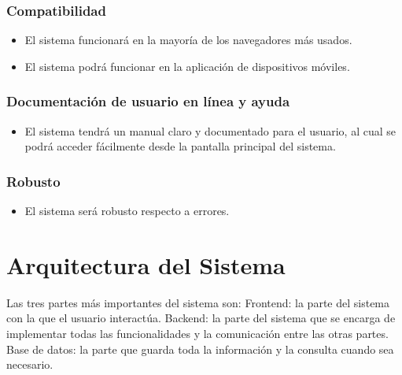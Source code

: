 \documentclass[12pt]{article}
\newcounter{ni}
\begin{document}
\subsubsection{Compatibilidad}
\begin{itemize}
    \item El sistema funcionará en la mayoría de los navegadores más usados.
    \item El sistema podrá funcionar en la aplicación de dispositivos móviles. 
\end{itemize}


\subsubsection{Documentación de usuario en línea y ayuda}
\begin{itemize}
    \item El sistema tendrá un manual claro y documentado para el usuario, al cual se podrá acceder fácilmente desde la pantalla principal del sistema.
\end{itemize}


\subsubsection{Robusto}
\begin{itemize}
    \item El sistema será robusto respecto a errores.
\end{itemize}






\section{Arquitectura del Sistema}

Las tres partes más importantes del sistema son:
Frontend: la parte del sistema con la que el usuario interactúa.
Backend: la parte del sistema que se encarga de implementar todas las funcionalidades y  la comunicación entre las otras partes.
Base de datos: la parte que guarda toda la información y la consulta cuando sea necesario.
\end{document}
